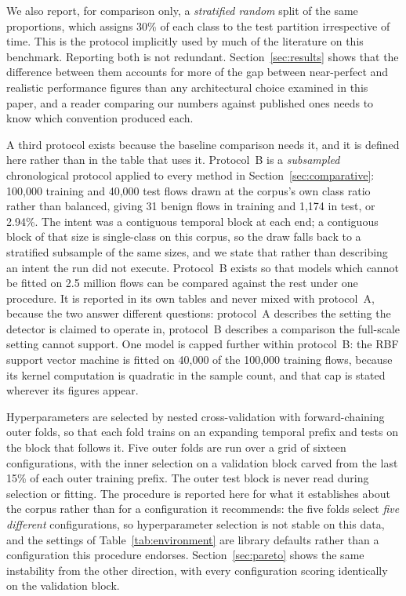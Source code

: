 \documentclass{ieeeaccess}
\begin{document}
We also report, for comparison only, a \emph{stratified random} split of the same proportions, which assigns 30\% of each class to the test partition irrespective of time. This is the protocol implicitly used by much of the literature on this benchmark. Reporting both is not redundant. Section~\ref{sec:results} shows that the difference between them accounts for more of the gap between near-perfect and realistic performance figures than any architectural choice examined in this paper, and a reader comparing our numbers against published ones needs to know which convention produced each.

A third protocol exists because the baseline comparison needs it, and it is defined here rather than in the table that uses it. Protocol~B is a \emph{subsampled} chronological protocol applied to every method in Section~\ref{sec:comparative}: 100,000 training and 40,000 test flows drawn at the corpus's own class ratio rather than balanced, giving 31 benign flows in training and 1,174 in test, or 2.94\%. The intent was a contiguous temporal block at each end; a contiguous block of that size is single-class on this corpus, so the draw falls back to a stratified subsample of the same sizes, and we state that rather than describing an intent the run did not execute. Protocol~B exists so that models which cannot be fitted on 2.5 million flows can be compared against the rest under one procedure. It is reported in its own tables and never mixed with protocol~A, because the two answer different questions: protocol~A describes the setting the detector is claimed to operate in, protocol~B describes a comparison the full-scale setting cannot support. One model is capped further within protocol~B: the RBF support vector machine is fitted on 40,000 of the 100,000 training flows, because its kernel computation is quadratic in the sample count, and that cap is stated wherever its figures appear.

Hyperparameters are selected by nested cross-validation with forward-chaining outer folds, so that each fold trains on an expanding temporal prefix and tests on the block that follows it. Five outer folds are run over a grid of sixteen configurations, with the inner selection on a validation block carved from the last 15\% of each outer training prefix. The outer test block is never read during selection or fitting. The procedure is reported here for what it establishes about the corpus rather than for a configuration it recommends: the five folds select \emph{five different} configurations, so hyperparameter selection is not stable on this data, and the settings of Table~\ref{tab:environment} are library defaults rather than a configuration this procedure endorses. Section~\ref{sec:pareto} shows the same instability from the other direction, with every configuration scoring identically on the validation block.
\end{document}

